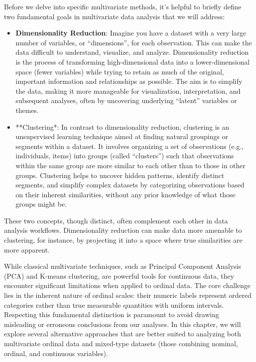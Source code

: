 \documentclass[
  letterpaper,
  DIV=11,
  numbers=noendperiod]{scrartcl}
\begin{document}
Before we delve into specific multivariate methods, it's helpful to
briefly define two fundamental goals in multivariate data analysis that
we will address:

\begin{itemize}
\item
  \textbf{Dimensionality Reduction}: Imagine you have a dataset with a
  very large number of variables, or ``dimensions'', for each
  observation. This can make the data difficult to understand,
  visualize, and analyze. Dimensionality reduction is the process of
  transforming high-dimensional data into a lower-dimensional space
  (fewer variables) while trying to retain as much of the original,
  important information and relationships as possible. The aim is to
  simplify the data, making it more manageable for visualization,
  interpretation, and subsequent analyses, often by uncovering
  underlying ``latent'' variables or themes.
\item
  **Clustering*: In contrast to dimensionality reduction, clustering is
  an unsupervised learning technique aimed at finding natural groupings
  or segments within a dataset. It involves organizing a set of
  observations (e.g., individuals, items) into groups (called
  ``clusters'') such that observations within the same group are more
  similar to each other than to those in other groups. Clustering helps
  to uncover hidden patterns, identify distinct segments, and simplify
  complex datasets by categorizing observations based on their inherent
  similarities, without any prior knowledge of what those groups might
  be.
\end{itemize}

These two concepts, though distinct, often complement each other in data
analysis workflows. Dimensionality reduction can make data more amenable
to clustering, for instance, by projecting it into a space where true
similarities are more apparent.

While classical multivariate techniques, such as Principal Component
Analysis (PCA) and K-means clustering, are powerful tools for continuous
data, they encounter significant limitations when applied to ordinal
data. The core challenge lies in the inherent nature of ordinal scales:
their numeric labels represent ordered categories rather than true
measurable quantities with uniform intervals. Respecting this
fundamental distinction is paramount to avoid drawing misleading or
erroneous conclusions from our analyses. In this chapter, we will
explore several alternative approaches that are better suited to
analyzing both multivariate ordinal data and mixed-type datasets (those
combining nominal, ordinal, and continuous variables).
\end{document}
